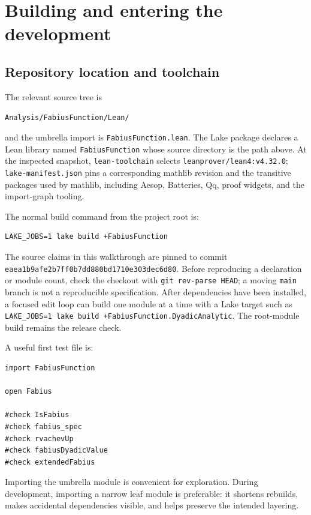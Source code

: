 \documentclass[11pt,oneside]{article}
\theoremstyle{definition}
\theoremstyle{remark}
\begin{document}
\makeatletter
\renewcommand*\l@subsection{\@dottedtocline{2}{1.5em}{3.0em}}
\makeatother
\tableofcontents
\newpage

\section{Building and entering the development}\label{ch:build}

\subsection{Repository location and toolchain}
The relevant source tree is
\begin{center}
\nolinkurl{Analysis/FabiusFunction/Lean/}
\end{center}
and the umbrella import is \nolinkurl{FabiusFunction.lean}.  The Lake package declares a Lean library named \nolinkurl{FabiusFunction} whose source directory is the path above.  At the inspected snapshot, \nolinkurl{lean-toolchain} selects \nolinkurl{leanprover/lean4:v4.32.0}; \nolinkurl{lake-manifest.json} pins a corresponding mathlib revision and the transitive packages used by mathlib, including Aesop, Batteries, Qq, proof widgets, and the import-graph tooling.

The normal build command from the project root is:
\begin{lstlisting}[style=pseudo]
LAKE_JOBS=1 lake build +FabiusFunction
\end{lstlisting}
The source claims in this walkthrough are pinned to commit
\nolinkurl{eaea1b9afe2b7ff0b7dd880bd1710e303dec6d80}.  Before reproducing a
declaration or module count, check the checkout with \texttt{git rev-parse
HEAD}; a moving \texttt{main} branch is not a reproducible specification.
After dependencies have been installed, a focused edit loop can build one
module at a time with a Lake target such as
\texttt{LAKE\_JOBS=1 lake build
+FabiusFunction.DyadicAnalytic}.  The root-module build
remains the release check.

A useful first test file is:
\begin{lstlisting}[style=pseudo]
import FabiusFunction

open Fabius

#check IsFabius
#check fabius_spec
#check rvachevUp
#check fabiusDyadicValue
#check extendedFabius
\end{lstlisting}
Importing the umbrella module is convenient for exploration.  During development, importing a narrow leaf module is preferable: it shortens rebuilds, makes accidental dependencies visible, and helps preserve the intended layering.
\end{document}
